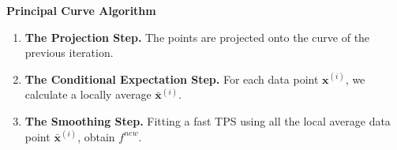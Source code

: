 \documentclass[9 pt]{beamer}
\def\xii{\mathbf{x}^{(i)}}
\begin{document}
\begin{frame}
{\bf Principal Curve Algorithm}
\begin{enumerate}
\item<2-| alert@2>{\bf The Projection Step.} The points are projected onto the curve of the previous iteration.
\item<3-| alert@3>{\bf The Conditional Expectation Step.} For each data point $\xii$, we calculate a locally average $\bar{\mathbf{x}}^{(i)}$.
\item<4-| alert@4>{\bf The Smoothing Step.} Fitting a fast TPS using all the local average data point $\bar{\mathbf{x}}^{(i)}$, obtain $f^{new}$.
\end{enumerate}
\begin{figure}[ht]
\begin{minipage}[b]{0.45\linewidth}
\centering
{}
\end{minipage}
\begin{minipage}[b]{0.45\linewidth}
\centering
{}
\end{minipage}
\end{figure}
\end{frame}
\end{document}
